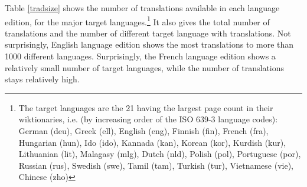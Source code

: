 \documentclass[sw]{iosart2c}
\begin{document}
Table \ref{tradsize} shows the number of translations available in each language edition, for the major target languages.\footnote{The target languages are the 21 having the largest page count in their wiktionaries, i.e. (by increasing order of the ISO 639-3 language codes):
German (deu),
Greek (ell),
English (eng),
Finnish (fin),
French (fra),
Hungarian (hun),
Ido (ido),
Kannada (kan),
Korean (kor),
Kurdish (kur),
Lithuanian (lit),
Malagasy (mlg),
Dutch (nld),
Polish (pol),
Portuguese (por),
Russian (rus),
Swedish (swe),
Tamil (tam),
Turkish (tur),
Vietnamese (vie),
Chinese (zho)
} It also gives the total number of translations and the number of different target language with translations. Not surprisingly, English language edition shows the most translations to more than 1000 different languages. Surprisingly, the French language edition shows a relatively small number of target languages, while the number of translations stays relatively high. 
\end{document}
